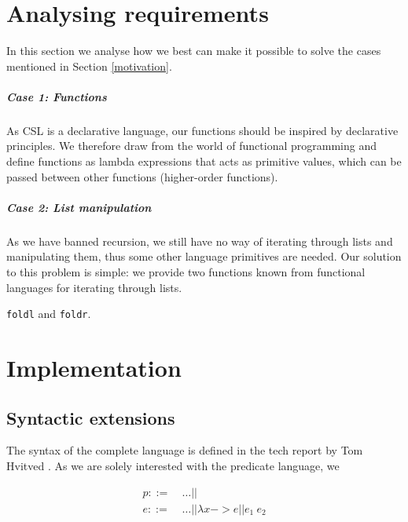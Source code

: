 \documentclass[10pt,a4paper,final,oneside,openany,article]{memoir}
\begin{document}
\chapter{Analysing requirements}
In this section we analyse how we best can make it possible to solve
the cases mentioned in Section \ref{motivation}.

\paragraph{Case 1: Functions} As CSL is a declarative language, our
functions should be inspired by declarative principles. We therefore
draw from the world of functional programming and define functions as
lambda expressions that acts as primitive values, which can be passed
between other functions (higher-order functions).

\paragraph{Case 2: List manipulation}
As we have banned recursion, we still have no way of iterating through
lists and manipulating them, thus some other language primitives are
needed. Our solution to this problem is simple: we provide two
functions known from functional languages for iterating through lists. 

\lstinline{foldl} and \lstinline{foldr}.

\chapter{Implementation}
\section{Syntactic extensions}
The syntax of the complete language is defined in the tech report by
Tom Hvitved \cite[p. 13]{hvitved10}. As we are solely interested with
the predicate language, we

\begin{align}
  p ::= &\ \ldots || \\
  e ::= &\ \ldots || \lambda x -> e || e_1\ e_2\\
\end{align}


\printbibliography
\end{document}
